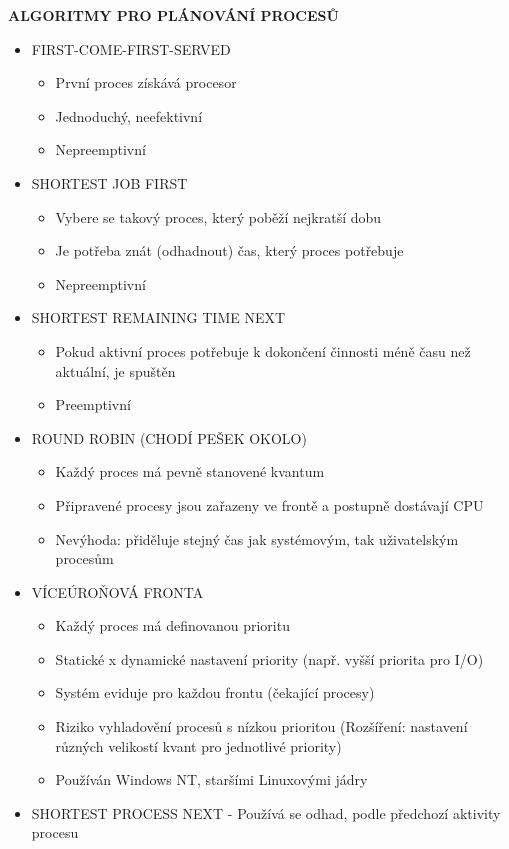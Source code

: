\documentclass[10pt,a4paper]{article}
\begin{document}
\textbf{ALGORITMY PRO PLÁNOVÁNÍ PROCESŮ}
\begin{itemize}
	\item FIRST-COME-FIRST-SERVED
	\begin{itemize}
		\item První proces získává procesor
		\item Jednoduchý, neefektivní
		\item Nepreemptivní
	\end{itemize}
	\item SHORTEST JOB FIRST
	\begin{itemize}
		\item Vybere se takový proces, který poběží nejkratší dobu
		\item Je potřeba znát (odhadnout) čas, který proces potřebuje
		\item Nepreemptivní
	\end{itemize}
	\item SHORTEST REMAINING TIME NEXT
	\begin{itemize}
		\item Pokud aktivní proces potřebuje k dokončení činnosti méně času než aktuální, je spuštěn
		\item Preemptivní
	\end{itemize}
	\item ROUND ROBIN (CHODÍ PEŠEK OKOLO)
	\begin{itemize}
		\item Každý proces má pevně stanovené kvantum
		\item Připravené procesy jsou zařazeny ve frontě a postupně dostávají CPU
		\item Nevýhoda: přiděluje stejný čas jak systémovým, tak uživatelským procesům
	\end{itemize}
	\item VÍCEÚROŇOVÁ FRONTA
	\begin{itemize}
		\item Každý proces má definovanou prioritu
		\item Statické x dynamické nastavení priority (např. vyšší priorita pro I/O)
		\item Systém eviduje pro každou frontu (čekající procesy)
		\item Riziko vyhladovění procesů s nízkou prioritou (Rozšíření: nastavení různých velikostí kvant pro jednotlivé priority)
		\item Používán Windows NT, staršími Linuxovými jádry
	\end{itemize}
	\item SHORTEST PROCESS NEXT - Používá se odhad, podle předchozí aktivity procesu

\end{itemize}
\end{document}
